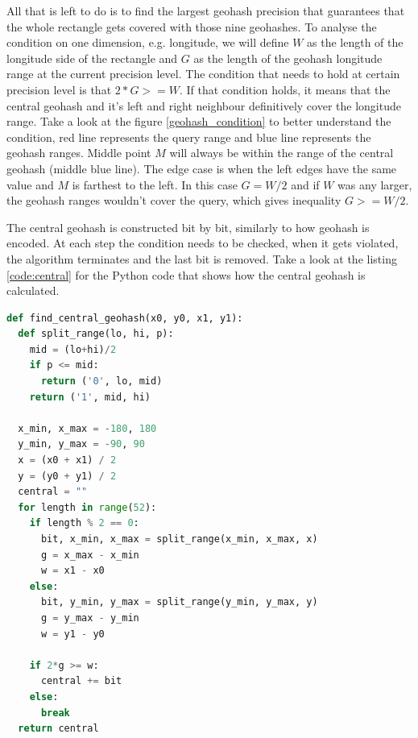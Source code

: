 \documentclass[times, utf8, diplomski]{fer}
\begin{document}
All that is left to do is to find the largest geohash precision that guarantees that the whole rectangle gets covered with those nine geohashes. To analyse the condition on one dimension, e.g. longitude, we will define $W$ as the length of the longitude side of the rectangle and $G$ as the length of the geohash longitude range at the current precision level. The condition that needs to hold at certain precision level is that $2*G >= W$. If that condition holds, it means that the central geohash and it's left and right neighbour definitively cover the longitude range. Take a look at the figure \ref{geohash_condition} to better understand the condition, red line represents the query range and blue line represents the geohash ranges. Middle point $M$ will always be within the range of the central geohash (middle blue line). The edge case is when the left edges have the same value and $M$ is farthest to the left. In this case $G=W/2$ and if $W$ was any larger, the geohash ranges wouldn't cover the query, which gives inequality $G >= W/2$.

The central geohash is constructed bit by bit, similarly to how geohash is encoded. At each step the condition needs to be checked, when it gets violated, the algorithm terminates and the last bit is removed. Take a look at the listing \ref{code:central} for the Python code that shows how the central geohash is calculated.

\label{code:central}
\begin{lstlisting}[language=Python, caption=Finding central geohash]
def find_central_geohash(x0, y0, x1, y1):
  def split_range(lo, hi, p):
    mid = (lo+hi)/2
    if p <= mid:
      return ('0', lo, mid)
    return ('1', mid, hi)

  x_min, x_max = -180, 180
  y_min, y_max = -90, 90
  x = (x0 + x1) / 2
  y = (y0 + y1) / 2
  central = ""
  for length in range(52):
    if length % 2 == 0:
      bit, x_min, x_max = split_range(x_min, x_max, x)
      g = x_max - x_min
      w = x1 - x0
    else:
      bit, y_min, y_max = split_range(y_min, y_max, y)
      g = y_max - y_min
      w = y1 - y0

    if 2*g >= w:
      central += bit
    else:
      break
  return central
\end{lstlisting}
\end{document}
